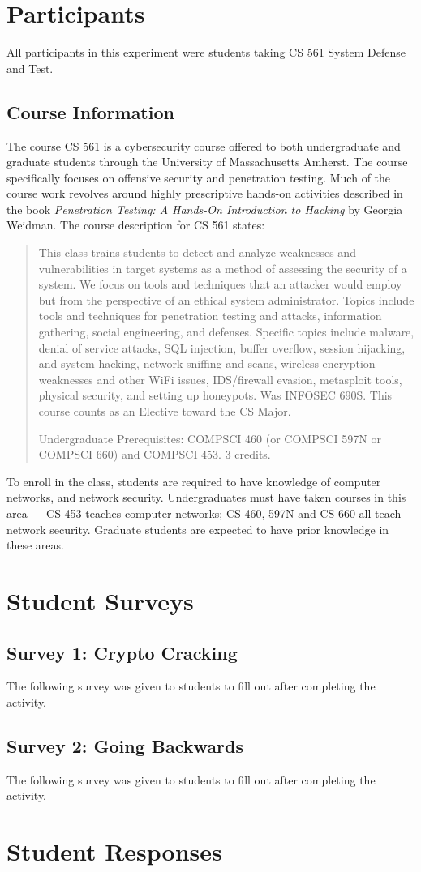 \providecommand{\heading}[1]{\section{#1}}
\providecommand{\subheading}[1]{\subsection{#1}}

\heading{Participants}
    All participants in this experiment were students taking CS 561 System Defense and Test.

    \subheading{Course Information}
        The course CS 561 is a cybersecurity course offered to both undergraduate and graduate students through the University of Massachusetts Amherst. %
The course specifically focuses on offensive security and penetration testing. %
Much of the course work revolves around highly prescriptive hands-on activities described in the book \textit{Penetration Testing: A Hands-On Introduction to Hacking} by Georgia Weidman. %
The course description for CS 561 states:

        \begin{quote}
            This class trains students to detect and analyze weaknesses and vulnerabilities in target systems as a method of assessing the security of a system. %
We focus on tools and techniques that an attacker would employ but from the perspective of an ethical system administrator. %
Topics include tools and techniques for penetration testing and attacks, information gathering, social engineering, and defenses. %
Specific topics include malware, denial of service attacks, SQL injection, buffer overflow, session hijacking, and system hacking, network sniffing and scans, wireless encryption weaknesses and other WiFi issues, IDS/firewall evasion, metasploit tools, physical security, and setting up honeypots. %
Was INFOSEC 690S. This course counts as an Elective toward the CS Major.

            Undergraduate Prerequisites: COMPSCI 460 (or COMPSCI 597N or COMPSCI 660) and COMPSCI 453. %
3 credits.
        \end{quote}
        \noindent
        To enroll in the class, students are required to have knowledge of computer networks, and network security. %
Undergraduates must have taken courses in this area ---%
 CS 453 teaches computer networks; %
CS 460, 597N and CS 660 all teach network security. %
Graduate students are expected to have prior knowledge in these areas. 

\heading{Student Surveys}\label{sec:blank-surveys}
\subheading{Survey 1: Crypto Cracking}\label{subsec:blank-surveys-cc}
\noindent
    The following survey was given to students to fill out after completing the  activity.


\subheading{{Survey 2: Going Backwards}}\label{subsec:blank-surveys-gb}
\noindent
    The following survey was given to students to fill out after completing the  activity.



\heading{Student Responses}
